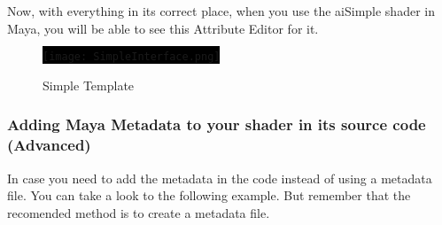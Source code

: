 Now, with everything in its correct place, when you use the aiSimple shader in Maya, you will be able to see this Attribute Editor for it.

\begin{figure}[H]
\centering
\colorbox{black}{\texttt{[image: SimpleInterface.png]}}
\caption{Simple Template}
\label{SimpleTemplate}
\end{figure}

\subsubsection{Adding Maya Metadata to your shader in its source code (Advanced)}

In case you need to add the metadata in the code instead of using a metadata file. You can take a look to the following example. But remember that the recomended method is to create a metadata file.

\inputminted[mathescape,
numbersep=5pt,
frame=lines,
framesep=2mm,
baselinestretch=1,
fontsize=\footnotesize,
tabsize=3,
label=mayaShader.cpp,
firstline=9,
lastline=20]
{cpp}{mayaShader.cpp}
